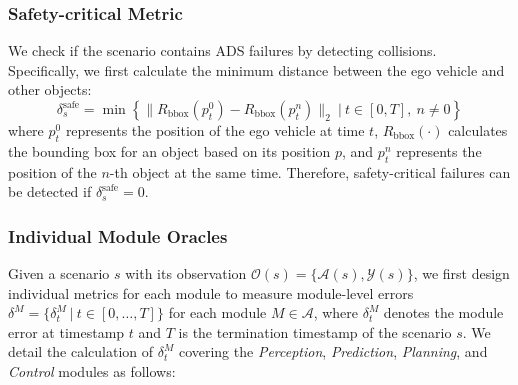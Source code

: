 \subsubsection{Safety-critical Metric}\label{sec:safe-metric} We check if the scenario contains ADS failures by detecting collisions. Specifically, we first calculate the minimum distance between the ego vehicle and other objects:
\begin{equation}\label{eq:safe}
    \delta_{s}^{\text{safe}} = \min \left\{ \| R_{\text{bbox}}({p}^{0}_{t}) - R_{\text{bbox}}({p}^{n}_{t}) \|_2 \ \big| \ t \in [0, T], \ n \neq 0 \right\}
\end{equation}
where \( {p}^{0}_{t} \) represents the position of the ego vehicle at time \( t \), \( R_{\text{bbox}}(\cdot) \) calculates the bounding box for an object based on its position \( p \), and \( {p}^{n}_{t} \) represents the position of the \( n \)-th object at the same time. 
Therefore, safety-critical failures can be detected if \( \delta_{s}^{\text{safe}} = 0 \).


\subsubsection{Individual Module Oracles}\label{sec:module-metric}
Given a scenario \( s \) with its observation \(\mathcal{O}(s) = \{\mathcal{A}(s), \mathcal{Y}(s)\}\), we first design individual metrics for each module to measure module-level errors \(\delta^{{M}} = \{\delta^{{M}}_t \ \big| \ t \in [0, \dots, T] \}\) for each module \({M} \in \mathcal{A} \), where \(\delta^{{M}}_t\) denotes the module error at timestamp \( t \) and \( T \) is the termination timestamp of the scenario \( s \).
We detail the calculation of \(\delta^{{M}}_t\) covering the \textit{Perception}, \textit{Prediction}, \textit{Planning}, and \textit{Control} modules as follows:

